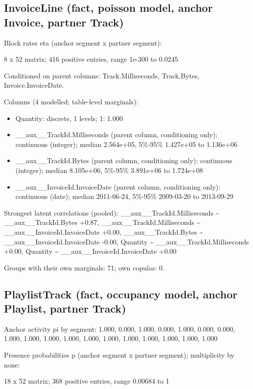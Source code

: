 \documentclass[10pt]{article}
\begin{document}
\subsection*{InvoiceLine (fact, poisson model, anchor Invoice, partner Track)}
Block rates eta (anchor segment x partner segment):


8 x 52 matrix; 416 positive entries, range 1e-300 to 0.0245


Conditioned on parent columns: Track.Milliseconds, Track.Bytes, Invoice.InvoiceDate.

Columns (4 modelled; table-level marginals):


\begin{itemize}
\item Quantity: discrete, 1 levels; 1: 1.000
\item \_\_aux\_\_TrackId.Milliseconds (parent column, conditioning only): continuous (integer); median 2.564e+05, 5\%-95\% 1.427e+05 to 1.136e+06
\item \_\_aux\_\_TrackId.Bytes (parent column, conditioning only): continuous (integer); median 8.105e+06, 5\%-95\% 3.891e+06 to 1.724e+08
\item \_\_aux\_\_InvoiceId.InvoiceDate (parent column, conditioning only): continuous (date); median 2011-06-24, 5\%-95\% 2009-03-20 to 2013-09-29
\end{itemize}
Strongest latent correlations (pooled): \_\_aux\_\_TrackId.Milliseconds \textasciitilde{} \_\_aux\_\_TrackId.Bytes +0.87, \_\_aux\_\_TrackId.Milliseconds \textasciitilde{} \_\_aux\_\_InvoiceId.InvoiceDate +0.00, \_\_aux\_\_TrackId.Bytes \textasciitilde{} \_\_aux\_\_InvoiceId.InvoiceDate -0.00, Quantity \textasciitilde{} \_\_aux\_\_TrackId.Milliseconds +0.00, Quantity \textasciitilde{} \_\_aux\_\_InvoiceId.InvoiceDate +0.00

Groups with their own marginals: 71; own copulas: 0.



\subsection*{PlaylistTrack (fact, occupancy model, anchor Playlist, partner Track)}
Anchor activity pi by segment: 1.000, 0.000, 1.000, 0.000, 1.000, 0.000, 0.000, 1.000, 1.000, 1.000, 1.000, 1.000, 1.000, 1.000, 1.000, 1.000, 1.000, 1.000

Presence probabilities p (anchor segment x partner segment); multiplicity by none:


18 x 52 matrix; 368 positive entries, range 0.00684 to 1
\end{document}
